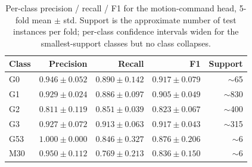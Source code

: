 \begin{table}[ht]
\centering
\caption{Per-class precision / recall / F1 for the motion-command head, 5-fold mean $\pm$ std. Support is the approximate number of test instances per fold; per-class confidence intervals widen for the smallest-support classes but no class collapses.}
\label{tab:per_class_command}
\begin{tabular}{lrrrr}
\toprule
Class & Precision & Recall & F1 & Support \\
\midrule
G0  & $0.946 \pm 0.052$ & $0.890 \pm 0.142$ & $0.917 \pm 0.079$ & $\sim$65  \\
G1  & $0.929 \pm 0.024$ & $0.886 \pm 0.097$ & $0.905 \pm 0.049$ & $\sim$830 \\
G2  & $0.811 \pm 0.119$ & $0.851 \pm 0.039$ & $0.823 \pm 0.067$ & $\sim$400 \\
G3  & $0.927 \pm 0.072$ & $0.913 \pm 0.063$ & $0.917 \pm 0.043$ & $\sim$315 \\
G53 & $1.000 \pm 0.000$ & $0.846 \pm 0.327$ & $0.876 \pm 0.206$ & $\sim$6   \\
M30 & $0.950 \pm 0.112$ & $0.769 \pm 0.213$ & $0.836 \pm 0.150$ & $\sim$6   \\
\bottomrule
\end{tabular}
\end{table}
